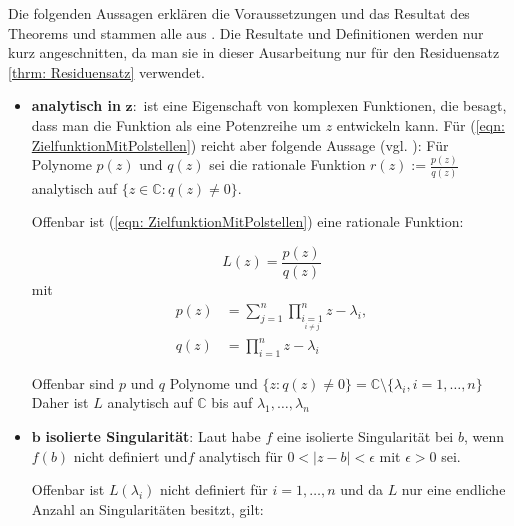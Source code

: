 \documentclass[a4paper,12pt]{report}
\newcommand{\C}{\mathbb C}
\newcommand{\1}{\mathds{1}}
\theoremstyle{plain} %
\theoremstyle{definition} %
\theoremstyle{remark}
\begin{document}
            Die folgenden Aussagen erklären die Voraussetzungen und das Resultat des Theorems und stammen alle aus \cite{complexAnalysis}.
            Die Resultate und Definitionen werden nur kurz angeschnitten, da man sie in dieser Ausarbeitung nur für den Residuensatz \ref{thrm: Residuensatz} verwendet.
            \begin{itemize}
                  \item \textbf{analytisch in }$\mathbf{z:}$ ist eine Eigenschaft von komplexen Funktionen, die besagt, dass man die Funktion als eine Potenzreihe um $z$ entwickeln kann.
                        Für (\ref{eqn: ZielfunktionMitPolstellen}) reicht aber folgende Aussage (vgl. \cite[S. 24]{complexAnalysis}):
                        Für Polynome $p(z)$ und $q(z)$ sei die rationale Funktion $r(z):=\frac{p(z)}{q(z)}$ analytisch auf $\{z\in\C: q(z)\ne 0\}$.
                        
                        Offenbar ist (\ref{eqn: ZielfunktionMitPolstellen}) eine rationale Funktion:

                        $$L(z) = \frac{p(z)}{q(z)}$$
                        mit 
                        \begin{align*}
                              p(z) &= \sum_{j=1}^{n}\prod_{\underset{i\ne j}{i=1}}^{n} z-\lambda_i,\\
                              q(z) &= \prod_{i=1}^{n} z-\lambda_i
                        \end{align*}

                        Offenbar sind $p$ und $q$ Polynome und $\{z: q(z)\ne 0\} = \C\setminus\{\lambda_i, i=1,\dots,n\}$
                        Daher ist $L$ analytisch auf $\C$ bis auf $\lambda_1,\dots,\lambda_n$
                  \item $\mathbf{b}$\textbf{ isolierte Singularität}:
                        Laut \cite[S. 74]{complexAnalysis} habe $f$ eine isolierte Singularität bei $b$, wenn $f(b)$ nicht definiert und$f$ analytisch für $0<|z-b|<\epsilon$ mit $\epsilon>0$ sei.

                        Offenbar ist $L(\lambda_i)$ nicht definiert für $i=1,\dots,n$ und da $L$ nur eine endliche Anzahl an Singularitäten besitzt, gilt:


\end{itemize}
\end{document}
